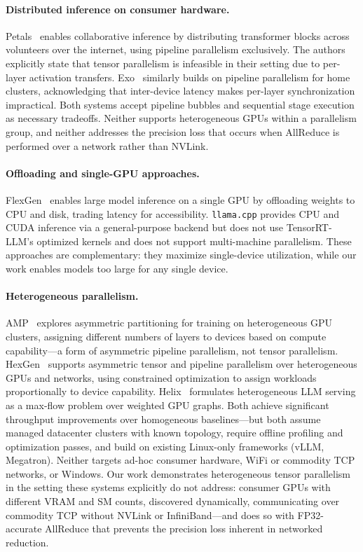 \documentclass[10pt,twocolumn]{article}
\begin{document}
\paragraph{Distributed inference on consumer hardware.}
Petals~\citep{borzunov2023petals} enables collaborative inference by
distributing transformer blocks across volunteers over the internet, using
pipeline parallelism exclusively.  The authors explicitly state that tensor
parallelism is infeasible in their setting due to per-layer activation
transfers.  Exo~\citep{exo2024} similarly builds on pipeline parallelism
for home clusters, acknowledging that inter-device latency makes per-layer
synchronization impractical.  Both systems accept pipeline bubbles and
sequential stage execution as necessary tradeoffs.  Neither supports
heterogeneous GPUs within a parallelism group, and neither addresses the
precision loss that occurs when AllReduce is performed over a network
rather than NVLink.

\paragraph{Offloading and single-GPU approaches.}
FlexGen~\citep{sheng2023flexgen} enables large model inference on a single
GPU by offloading weights to CPU and disk, trading latency for
accessibility.  \texttt{llama.cpp} provides CPU and CUDA inference via a
general-purpose backend but does not use TensorRT-LLM's optimized kernels
and does not support multi-machine parallelism.  These approaches are
complementary: they maximize single-device utilization, while our work
enables models too large for any single device.

\paragraph{Heterogeneous parallelism.}
AMP~\citep{lee2022amp} explores asymmetric partitioning for training on
heterogeneous GPU clusters, assigning different numbers of layers to
devices based on compute capability---a form of asymmetric pipeline
parallelism, not tensor parallelism.  HexGen~\citep{jiang2024hexgen}
supports asymmetric tensor and pipeline parallelism over heterogeneous GPUs
and networks, using constrained optimization to assign workloads
proportionally to device capability.  Helix~\citep{mei2025helix}
formulates heterogeneous LLM serving as a max-flow problem over weighted
GPU graphs.  Both achieve significant throughput improvements over
homogeneous baselines---but both assume managed datacenter clusters with
known topology, require offline profiling and optimization passes, and
build on existing Linux-only frameworks (vLLM, Megatron).  Neither targets
ad-hoc consumer hardware, WiFi or commodity TCP networks, or Windows.  Our
work demonstrates heterogeneous tensor parallelism in the setting these
systems explicitly do not address: consumer GPUs with different VRAM and SM
counts, discovered dynamically, communicating over commodity TCP without
NVLink or InfiniBand---and does so with FP32-accurate AllReduce that
prevents the precision loss inherent in networked reduction.
\end{document}
